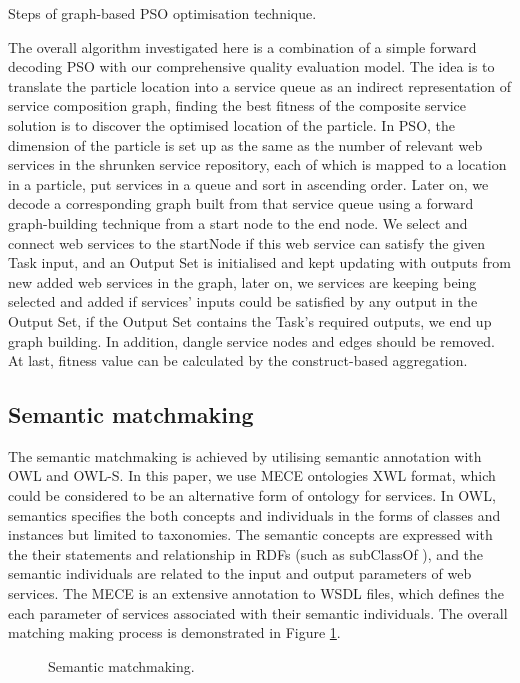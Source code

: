 \documentclass{llncs}
\begin{document}
\begin{algorithm}[!htb]
 \caption{Steps of graph-based PSO optimisation technique.}
\label{psoSteps}
\end{algorithm}
The overall algorithm investigated here is a combination of a simple forward decoding PSO \cite{da2016particle} with our comprehensive quality evaluation model. The idea is to translate the particle location into a service queue as an indirect representation of service composition graph, finding the best fitness of the composite service solution is to discover the optimised location of the particle. In PSO, the dimension of the particle is set up as the same as the number of relevant web services in the shrunken service repository, each of which is mapped to a location in a particle, put services in a queue and sort in ascending order. Later on, we decode a corresponding graph built from that service queue using a forward graph-building technique from a start node to the end node. We select and connect web services to the startNode if this web service can satisfy the given Task input, and an Output Set is initialised and kept updating with outputs from new added web services in the graph, later on, we services are keeping being selected and added if services' inputs could be satisfied by any output in the Output Set, if the Output Set contains the Task's required outputs, we end up graph building. In addition, dangle service nodes and edges should be removed. At last, fitness value can be calculated by the construct-based aggregation.

\subsection{Semantic matchmaking}
The semantic matchmaking is achieved by utilising semantic annotation with OWL and OWL-S. In this paper, we use MECE ontologies \cite{bleul2008self} XWL format, which could be considered to be an alternative form of ontology for services. In OWL, semantics specifies the both concepts and individuals in the forms of classes and instances but limited to taxonomies. The semantic concepts are expressed with the their statements and relationship in RDFs (such as subClassOf ), and the semantic individuals are related to the input and output parameters of web services. The MECE is an extensive annotation to WSDL files, which defines the each parameter of services associated with their semantic individuals. The overall matching making process is demonstrated in Figure \ref{matchmaking}.

\begin{figure}[h]
\centerline{
}
 \caption{Semantic matchmaking.}
 \label{matchmaking}
\end{figure}
\end{document}
